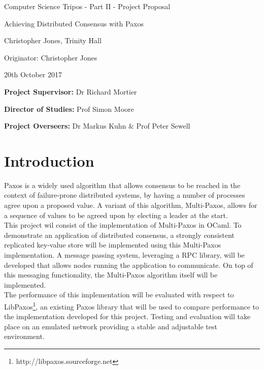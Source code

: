 \vfil

\centerline{\Large Computer Science Tripos - Part II - Project Proposal}
\vspace{0.2in}
\centerline{\Large Achieving Distributed Consensus with Paxos}
\vspace{0.2in}
\centerline{\large Christopher Jones, Trinity Hall}
\vspace{0.1in}
\centerline{\large Originator: Christopher Jones}
\vspace{0.1in}
\centerline{\large 20th October 2017}

\vspace{0.4in}

\noindent
{\bf Project Supervisor:} Dr Richard Mortier
\vspace{0.1in}

\noindent
{\bf Director of Studies:} Prof Simon Moore
\vspace{0.1in}
\noindent
 
\noindent
{\bf Project Overseers:} Dr Markus Kuhn \& Prof Peter Sewell

\section*{Introduction}
Paxos is a widely used algorithm that allows consensus to be reached in the context of failure-prone distributed systems, by having a number of processes agree upon a proposed value. A variant of this algorithm, Multi-Paxos, allows for a sequence of values to be agreed upon by electing a leader at the start. \\

This project wil consist of the implementation of Multi-Paxos in OCaml. To demonstrate an application of distributed consensus, a strongly consistent replicated key-value store will be implemented using this Multi-Paxos implementation. A message passing system, leveraging a RPC library, will be developed that allows nodes running the application to communicate. On top of this messaging functionality, the Multi-Paxos algorithm itself will be implemented. \\

The performance of this implementation will be evaluated with respect to LibPaxos\footnote{http://libpaxos.sourceforge.net}, an existing Paxos library that will be used to compare performance to the implementation developed for this project. Testing and evaluation will take place on an emulated network providing a stable and adjustable test environment.

